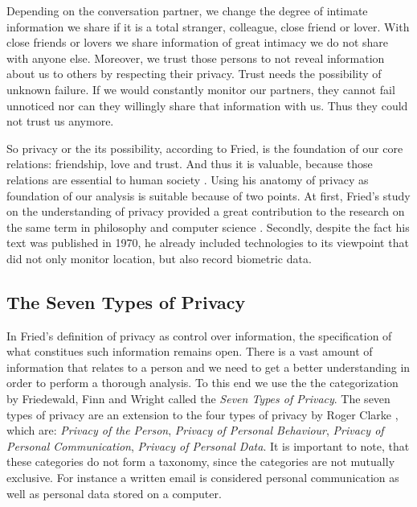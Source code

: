 \documentclass[runningheads,a4paper]{llncs}
\newenvironment{LGContent-Hidden}{ \comment  }{ }
\begin{document}
\begin{LGContent-Hidden}
Depending on the conversation partner, we change the degree of intimate information we share if it is a total stranger, colleague, close friend or lover.
With close friends or lovers we share information of great intimacy we do not share with anyone else.
Moreover, we trust those persons to not reveal information about us to others by respecting their privacy.
Trust needs the possibility of unknown failure.
If we would constantly monitor our partners, they cannot fail unnoticed nor can they willingly share that information with us.
Thus they could not trust us anymore. \cite{CFried:Privacy}

So privacy or the its possibility, according to Fried, is the foundation of our core relations: friendship, love and trust.
And thus it is valuable, because those relations are essential to human society \cite{CFried:Privacy}.
Using his anatomy of privacy as foundation of our analysis is suitable because of two points.
At first, Fried's study on the understanding of privacy provided a great contribution to the research on the same term in philosophy \cite{sep-privacy} and computer science \cite{SociotechnicalArchitectureForOnlinePrivacy}.
Secondly, despite the fact his text was published in 1970, he already included technologies to its viewpoint that did not only monitor location, but also record biometric data.
\end{LGContent-Hidden}

\subsection{The Seven Types of Privacy}
\label{sec:privacytypes}

In Fried's definition of privacy as control over information, the specification of what constitues such information remains open.
There is a vast amount of information that relates to a person and we need to get a better understanding in order to perform a thorough analysis.
To this end we use the the categorization by Friedewald, Finn and Wright \cite{7ToP} called the \textit{Seven Types of Privacy}.
The seven types of privacy are an extension to the four types of privacy by Roger Clarke \cite{RClarke:4ToP}, which are:
\textit{Privacy of the Person},
\textit{Privacy of Personal Behaviour},
\textit{Privacy of Personal Communication},
\textit{Privacy of Personal Data}.
It is important to note, that these categories do not form a taxonomy, since the categories are not mutually exclusive.
For instance a written email is considered personal communication as well as personal data stored on a computer.
\end{document}
